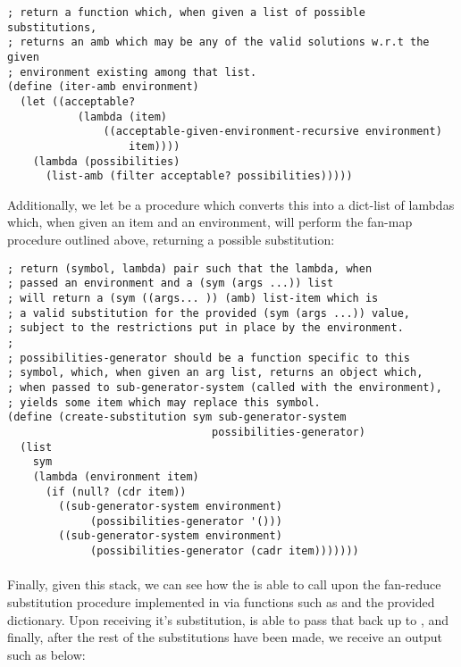 \begin{verbatim}
; return a function which, when given a list of possible substitutions,
; returns an amb which may be any of the valid solutions w.r.t the given
; environment existing among that list.
(define (iter-amb environment)
  (let ((acceptable?
           (lambda (item)
               ((acceptable-given-environment-recursive environment)
                   item))))
    (lambda (possibilities)
      (list-amb (filter acceptable? possibilities)))))
\end{verbatim}


Additionally, we let  be a procedure which converts this into a dict-list of lambdas which, when given an item and an environment, will perform the fan-map procedure outlined above, returning a possible substitution:

\begin{verbatim}
; return (symbol, lambda) pair such that the lambda, when
; passed an environment and a (sym (args ...)) list
; will return a (sym ((args... )) (amb) list-item which is
; a valid substitution for the provided (sym (args ...)) value,
; subject to the restrictions put in place by the environment.
;
; possibilities-generator should be a function specific to this
; symbol, which, when given an arg list, returns an object which,
; when passed to sub-generator-system (called with the environment),
; yields some item which may replace this symbol.
(define (create-substitution sym sub-generator-system
                                possibilities-generator)
  (list
    sym
    (lambda (environment item)
      (if (null? (cdr item))
        ((sub-generator-system environment)
             (possibilities-generator '()))
        ((sub-generator-system environment)
             (possibilities-generator (cadr item)))))))
\end{verbatim}

\paragraph{}
Finally, given this stack, we can see how the  is able to call upon the fan-reduce substitution procedure implemented in  via functions such as  and the provided  dictionary. Upon receiving it's substitution,  is able to pass that back up to , and finally, after the rest of the substitutions have been made, we receive an output such as below:

